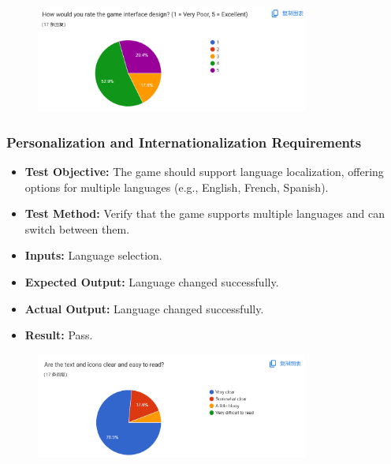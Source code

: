 \documentclass[12pt, titlepage]{article}
\begin{document}
\begin{figure}[h!]
    \centering
    \includegraphics[width=0.8\textwidth]{image.png}
    \caption{}
    \label{fig:labelname}
\end{figure}






\subsubsection{Personalization and Internationalization Requirements}
\begin{itemize}

        \item \textbf{Test Objective:} The game should support language localization, offering options for multiple languages (e.g., English, French, Spanish).
    \item \textbf{Test Method:} Verify that the game supports multiple languages and can switch between them.
    \item \textbf{Inputs:} Language selection.
    \item \textbf{Expected Output:} Language changed successfully.
    \item \textbf{Actual Output:} Language changed successfully.
    \item \textbf{Result:} Pass.
\end{itemize}

\begin{figure}[h!]
    \centering
    \includegraphics[width=0.8\textwidth]{image1.png}
    \caption{}
    \label{fig:labelname}
\end{figure}
\end{document}
